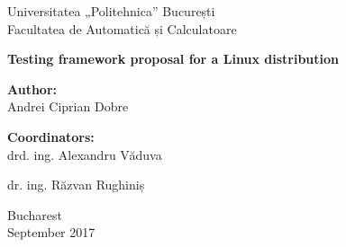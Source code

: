 \thispagestyle{empty}
\begin{center}
\large
Universitatea „Politehnica” București \\
Facultatea de Automatică și Calculatoare \\
% 
% 
% 

{\LARGE
	\textbf{Testing framework proposal for a Linux distribution}
}

\vspace{3cm}
\textbf{Author:}\\
Andrei Ciprian Dobre

\bigskip
\bigskip

\textbf{Coordinators:}\\
drd. ing. Alexandru Văduva

dr. ing. Răzvan Rughiniș

Bucharest\\
September 2017 \\
\vspace*{1cm}
\end{center}
